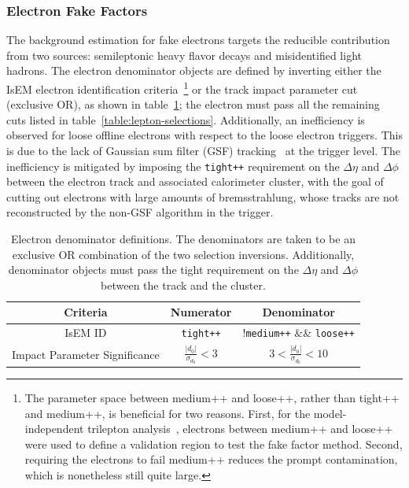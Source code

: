 \subsubsection{Electron Fake Factors}\label{sec:electron-fake-factors}
The background estimation for fake electrons targets the reducible contribution from two sources: semileptonic heavy flavor decays and misidentified light hadrons. The electron denominator objects are defined by inverting either the IsEM electron identification criteria~\footnote{The parameter space between medium++ and loose++, rather than tight++ and medium++, is beneficial for two reasons. First, for the model-independent trilepton analysis~\cite{DeViveiros:1670929}, electrons between medium++ and loose++ were used to define a validation region to test the fake factor method. Second, requiring the electrons to fail medium++ reduces the prompt contamination, which is nonetheless still quite large.} or the track impact parameter cut (exclusive OR), as shown in table~\ref{table:electron-denominator-definition}; the electron must pass all the remaining cuts listed in table~\ref{table:lepton-selections}. Additionally, an inefficiency is observed for loose offline electrons with respect to the loose electron triggers. This is due to the lack of Gaussian sum filter (GSF) tracking~\cite{ATLAS-CONF-2012-047} at the trigger level. The inefficiency is mitigated by imposing the \verb.tight++. requirement on the $\Delta\eta$ and $\Delta\phi$ between the electron track and associated calorimeter cluster, with the goal of cutting out electrons with large amounts of bremsstrahlung, whose tracks are not reconstructed by the non-GSF algorithm in the trigger. 


\begin{table}[h]
  \centering
  \begin{tabular}{ccc}
	\hline
	Criteria & Numerator & Denominator \\ \hline
	IsEM ID & \verb.tight++. & !\verb.medium++. \&\& \verb.loose++.  \\
	Impact Parameter Significance & $\frac{|d_0|}{\sigma_{d_0}} < 3$ & $3 < \frac{|d_0|}{\sigma_{d_0}} < 10$ \\
	\hline
  \end{tabular}
  \caption{Electron denominator definitions. The denominators are taken to be an exclusive OR combination of the two selection inversions. Additionally, denominator objects must pass the tight requirement on the $\Delta\eta$ and $\Delta\phi$ between the track and the cluster.}
  \label{table:electron-denominator-definition}
\end{table}

